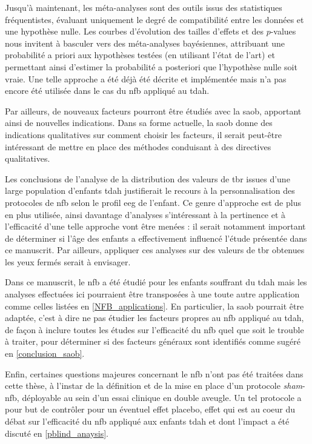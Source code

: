 Jusqu'à maintenant, les méta-analyses sont des outils issus des statistiques fréquentistes,
évaluant uniquement le degré de compatibilité entre les données et une hypothèse nulle.
Les courbes d'évolution des tailles d'effets et des $p$-values nous invitent à basculer vers des méta-analyses bayésiennes,
attribuant une probabilité a priori aux hypothèses testées (en utilisant l'état de l'art) et permettant ainsi d'estimer 
la probabilité a posteriori que l'hypothèse nulle soit vraie.
Une telle approche a été déjà été décrite et implémentée \citep{Dormuth2016, Spiegelhalter2004} mais n'a pas encore été 
utilisée dans le cas du \gls{nfb} appliqué au \gls{tdah}.  

Par ailleurs, de nouveaux facteurs pourront être étudiés avec la \gls{saob}, apportant ainsi de nouvelles  
indications. Dans sa forme actuelle, la \gls{saob} donne des indications qualitatives sur comment choisir les facteurs, 
il serait peut-être intéressant de mettre en place des méthodes conduisant à des directives qualitatives.

Les conclusions de l'analyse de la distribution des valeurs de \gls{tbr} issues d'une large population d'enfants \gls{tdah} justifierait le recours à la 
personnalisation des protocoles de \gls{nfb} selon le profil \gls{eeg} de l'enfant. Ce genre d'approche est de plus en plus utilisée, ainsi davantage 
d'analyses s'intéressant
à la pertinence et à l'efficacité d'une telle approche vont être menées : il serait notamment important de déterminer si l'âge des enfants 
a effectivement influencé l'étude
présentée dans ce manuscrit. Par ailleurs, appliquer ces analyses sur des valeurs de \gls{tbr} obtenues les yeux fermés serait à envisager. 

Dans ce manuscrit, le \gls{nfb} a été étudié pour les enfants souffrant du \gls{tdah} mais les analyses effectuées ici pourraient être 
transposées à une toute autre application comme celles listées en \ref{NFB_applications}.
En particulier, la \gls{saob} pourrait être adaptée, c'est à dire ne pas étudier les facteurs propres au \gls{nfb} 
appliqué au \gls{tdah}, de façon à inclure toutes les études sur l'efficacité du \gls{nfb} 
quel que soit le trouble à traiter, pour déterminer si des facteurs généraux sont identifiés comme sugéré en \ref{conclusion_saob}. 

Enfin, certaines questions majeures concernant le \gls{nfb} n'ont pas été traitées dans cette thèse,
à l'instar de la définition et de la mise en place d'un protocole \textit{sham}-\gls{nfb}, déployable au sein d'un essai clinique en double aveugle. 
Un tel protocole 
a pour but de contrôler pour un éventuel effet placebo, effet qui est au coeur du débat sur l'efficacité du \gls{nfb} appliqué aux enfants \gls{tdah} 
et dont l'impact
a été discuté en \ref{pblind_anaysis}. 

